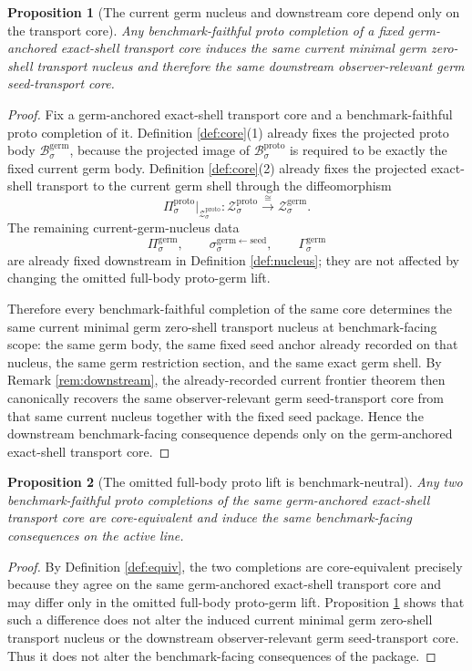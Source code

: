 \documentclass[11pt]{article}
\newcommand{\GermBody}[1]{\mathcal B_{#1}^{\mathrm{germ}}}
\newcommand{\GermProj}[1]{\Pi_{#1}^{\mathrm{germ}}}
\newcommand{\GermSeedSec}[1]{\sigma_{#1}^{\mathrm{germ\leftarrow seed}}}
\newcommand{\GermSection}[1]{\Gamma_{#1}^{\mathrm{germ}}}
\newcommand{\GermShell}[1]{\mathcal Z_{#1}^{\mathrm{germ}}}
\newcommand{\ProtoBody}[1]{\mathcal B_{#1}^{\mathrm{proto}}}
\newcommand{\ProtoProj}[1]{\Pi_{#1}^{\mathrm{proto}}}
\newcommand{\ProtoShell}[1]{\mathcal Z_{#1}^{\mathrm{proto}}}
\newtheorem{proposition}{Proposition}
\begin{document}
\begin{proposition}[The current germ nucleus and downstream core depend only on the transport core]
\label{prop:downstream}
Any benchmark-faithful proto completion of a fixed germ-anchored exact-shell transport core induces the same current minimal germ zero-shell transport nucleus and therefore the same downstream observer-relevant germ seed-transport core.
\end{proposition}

\begin{proof}
Fix a germ-anchored exact-shell transport core and a benchmark-faithful proto completion of it. Definition \ref{def:core}(1) already fixes the projected proto body \(\GermBody{\sigma}\), because the projected image of \(\ProtoBody{\sigma}\) is required to be exactly the fixed current germ body. Definition \ref{def:core}(2) already fixes the projected exact-shell transport to the current germ shell through the diffeomorphism
\[
\ProtoProj{\sigma}\big|_{\ProtoShell{\sigma}}
:
\ProtoShell{\sigma}
\xrightarrow{\cong}
\GermShell{\sigma}.
\]
The remaining current-germ-nucleus data
\[
\GermProj{\sigma},
\qquad
\GermSeedSec{\sigma},
\qquad
\GermSection{\sigma}
\]
are already fixed downstream in Definition \ref{def:nucleus}; they are not affected by changing the omitted full-body proto-germ lift.

Therefore every benchmark-faithful completion of the same core determines the same current minimal germ zero-shell transport nucleus at benchmark-facing scope: the same germ body, the same fixed seed anchor already recorded on that nucleus, the same germ restriction section, and the same exact germ shell. By Remark \ref{rem:downstream}, the already-recorded current frontier theorem then canonically recovers the same observer-relevant germ seed-transport core from that same current nucleus together with the fixed seed package. Hence the downstream benchmark-facing consequence depends only on the germ-anchored exact-shell transport core.
\end{proof}

\begin{proposition}[The omitted full-body proto lift is benchmark-neutral]
\label{prop:equiv}
Any two benchmark-faithful proto completions of the same germ-anchored exact-shell transport core are core-equivalent and induce the same benchmark-facing consequences on the active line.
\end{proposition}

\begin{proof}
By Definition \ref{def:equiv}, the two completions are core-equivalent precisely because they agree on the same germ-anchored exact-shell transport core and may differ only in the omitted full-body proto-germ lift. Proposition \ref{prop:downstream} shows that such a difference does not alter the induced current minimal germ zero-shell transport nucleus or the downstream observer-relevant germ seed-transport core. Thus it does not alter the benchmark-facing consequences of the package.
\end{proof}
\end{document}
